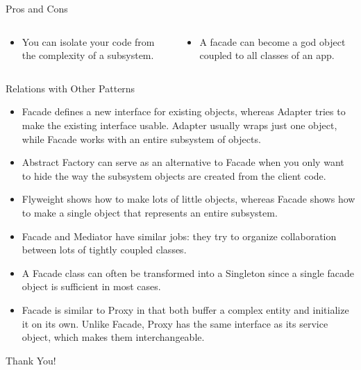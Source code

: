 \documentclass[13pt]{beamer}
\begin{document}
\begin{frame}{Pros and Cons}
	\begin{columns}[T]
		\begin{column}{.5\textwidth}
			\begin{itemize}
				\item You can isolate your code from the complexity of a subsystem.
			\end{itemize}
		\end{column}
	
		\begin{column}{.5\textwidth}
			\begin{itemize}
				\item A facade can become a god object coupled to all classes of an app.
			\end{itemize}
		\end{column}
	\end{columns}
\end{frame}

\begin{frame}{Relations with Other Patterns}
	\begin{itemize}
		\setlength\itemsep{1em}
		\item Facade defines a new interface for existing objects, whereas Adapter tries to make the existing interface usable. Adapter usually wraps just one object, while Facade works with an entire subsystem of objects.
		\item Abstract Factory can serve as an alternative to Facade when you only want to hide the way the subsystem objects are created from the client code.
		\item Flyweight shows how to make lots of little objects, whereas Facade shows how to make a single object that represents an entire subsystem.
		\item Facade and Mediator have similar jobs: they try to organize collaboration between lots of tightly coupled classes.
		\item A Facade class can often be transformed into a Singleton since a single facade object is sufficient in most cases.
		\item Facade is similar to Proxy in that both buffer a complex entity and initialize it on its own. Unlike Facade, Proxy has the same interface as its service object, which makes them interchangeable.
	\end{itemize}
\end{frame}

\begin{frame}
\begin{center}
{\fontsize{40}{50}\selectfont Thank You!}
\end{center}
\end{frame}
\end{document}
